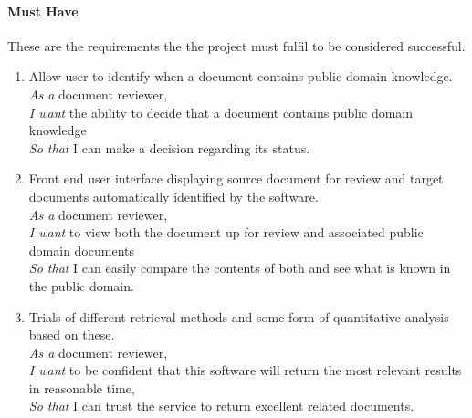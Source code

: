 \documentclass{l4proj}
\begin{document}
\paragraph{Must Have}
These are the requirements the the project must fulfil to be considered successful.
\begin{enumerate}[label=\textbf{M.\arabic*}]
\item Allow user to identify when a document contains public domain knowledge. \\
\textit{As a} document reviewer, \\
\textit{I want} the ability to decide that a document contains public domain knowledge \\
\textit{So that} I can make a decision regarding its status. \\
\item Front end user interface displaying source document for review and target documents automatically identified by the software. \\
\textit{As a} document reviewer, \\
\textit{I want} to view both the document up for review and associated public domain documents \\
\textit{So that} I can easily compare the contents of both and see what is known in the public domain.
\item Trials of different retrieval methods and some form of quantitative analysis based on these. \\
\textit{As a} document reviewer, \\
\textit{I want} to be confident that this software will return the most relevant results in reasonable time, \\
\textit{So that} I can trust the service to return excellent related documents.
\end{enumerate}
\end{document}
